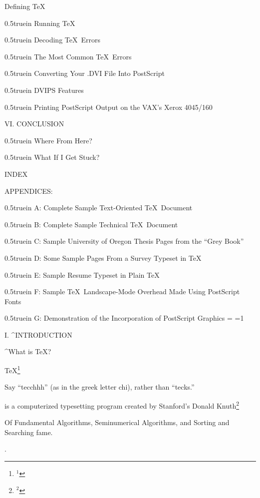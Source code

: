 Defining \TeX\ \leaderfill{}
\par\hglue 0.5truein
Running \TeX\ \leaderfill{}
\par\hglue 0.5truein
Decoding \TeX\ Errors \leaderfill{}
\par\hglue 0.5truein
The Most Common \TeX\ Errors \leaderfill{}
\par\hglue 0.5truein
Converting Your {\twltt .DVI} File Into PostScript \leaderfill{}
\par\hglue 0.5truein
DVIPS Features \leaderfill{}
\par\hglue 0.5truein
Printing PostScript Output on the VAX's Xerox 4045/160 \leaderfill{}
\bigskip\par\noindent
VI. CONCLUSION
\medskip\par\hglue 0.5truein
Where From Here? \leaderfill{}
\par\hglue 0.5truein
What If I Get Stuck? \leaderfill{}
\bigskip\par\noindent
INDEX
\bigskip\par\noindent
APPENDICES:
\medskip\par\hglue 0.5truein
A: Complete Sample Text-Oriented \TeX\ Document
\par\hglue 0.5truein
B: Complete Sample Technical \TeX\ Document
\par\hglue 0.5truein
C: Sample University of Oregon Thesis Pages from the ``Grey Book''
\par\hglue 0.5truein
D: Some Sample Pages From a Survey Typeset in \TeX\ 
\par\hglue 0.5truein
E: Sample Resume Typeset in Plain \TeX\
\par\hglue 0.5truein  
F: Sample \TeX\ Landscape-Mode Overhead Made Using PostScript Fonts
\par\hglue 0.5truein
G: Demonstration of the Incorporation of PostScript Graphics
\vfill\eject
\headline={\rm\hfill\folio{}\baselineskip}
\count0=1
\centerline{\twlbf I. ^{INTRODUCTION}}
\bigskip\par\noindent
\centerline{\twlbf ^{What is \TeX{}?}}
\bigskip\par\noindent
\TeX{}\footnote{$^{1}$}{Say ``tecchhh'' (as in the greek letter chi),
rather than ``tecks.''\par} is a computerized typesetting program created 
by Stanford's Donald 
Knuth\footnote{$^{2}$}{Of {\twlit Fundamental Algorithms, 
Seminumerical Algorithms,} and {\twlit Sorting and Searching} fame.\par}.
